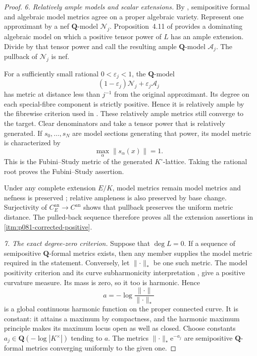 \begin{proof}
\emph{6. Relatively ample models and scalar extensions.}
By \cite[Theorem~1.1]{GM19}, semipositive formal and algebraic model
metrics agree on a proper algebraic variety.  Represent one approximant
by a nef $\mathbf Q$-model $\mathcal N_j$.  Proposition~4.11 of
\cite{GM19} provides a dominating algebraic model on which a positive
tensor power of $L$ has an ample extension.  Divide by that tensor
power and call the resulting ample $\mathbf Q$-model $\mathcal A_j$.
The pullback of $\mathcal N_j$ is nef.

For a sufficiently small rational $0<\varepsilon_j<1$, the
$\mathbf Q$-model
\[
            (1-\varepsilon_j)\mathcal N_j+
                           \varepsilon_j\mathcal A_j
\]
has metric at distance less than $j^{-1}$ from the original
approximant.  Its degree on each special-fibre component is strictly
positive.  Hence it is relatively ample by the fibrewise criterion
used in \cite[Proposition~4.13]{GM19}.  These relatively ample metrics
still converge to the target.  Clear denominators and take a tensor
power that is relatively generated.  If $s_0,\ldots,s_N$ are model
sections generating that power, its model metric is characterized by
\[
                           \max_\alpha\|s_\alpha(x)\|=1.
\]
This is the Fubini--Study metric of the generated $K^\circ$-lattice.
Taking the rational root proves the Fubini--Study assertion.

Under any complete extension $E/K$, model metrics remain model
metrics and nefness is preserved
\cite[Proposition~2.18(a) and Lemma~3.3]{GM19}; relative ampleness is
also preserved by base change.  Surjectivity of
$C_E^{\mathrm{an}}\to C^{\mathrm{an}}$ shows that pullback preserves
the uniform metric distance.  The pulled-back sequence therefore
proves all the extension assertions in
\cref{itm:p081-corrected-positive}.

\emph{7. The exact degree-zero criterion.}
Suppose that $\deg L=0$.
If a sequence of semipositive $\mathbf Q$-formal metrics exists,
then any member supplies the model metric required in the statement.
Conversely, let $\lVert\cdot\rVert_*$ be one such metric.
The model positivity criterion and its curve subharmonicity
interpretation \cite[Proposition~3.5]{GM19},
\cite[Proposition~5.1]{GR25PL} give a positive curvature measure.
Its mass is zero, so it too is harmonic.  Hence
\[
                  a=-\log
                    \frac{\lVert\cdot\rVert}{\lVert\cdot\rVert_*}
\]
is a global continuous harmonic function on the proper connected curve.
It is constant: it attains a maximum by compactness, and the harmonic
maximum principle makes its maximum locus open as well as closed.
Choose constants
$a_j\in\mathbf Q(-\log|K^\times|)$ tending to $a$.
The metrics
$\lVert\cdot\rVert_*\mathrm e^{-a_j}$ are semipositive
$\mathbf Q$-formal metrics converging uniformly to the given one.


\end{proof}
